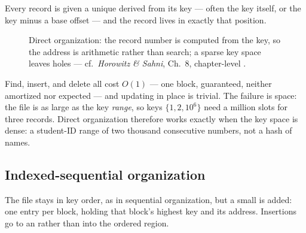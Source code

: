 \documentclass[11pt]{article}
\begin{document}
Every record is given a unique  derived from its key --- often the key itself, or the key minus a base offset --- and the record lives in exactly that position.

\begin{figure}[h]
  \centering
  \caption{Direct organization: the record number is computed from the key, so the address is arithmetic rather than search; a sparse key space leaves holes --- cf.\ \textit{Horowitz \& Sahni}, Ch.~8, chapter-level \cite{HorowitzSahni2008_fundamentals_data_structures}.}
\end{figure}

Find, insert, and delete all cost $O(1)$ --- one block, guaranteed, neither amortized nor expected --- and updating in place is trivial. The failure is space: the file is as large as the key \emph{range}, so keys $\{1, 2, 10^6\}$ need a million slots for three records. Direct organization therefore works exactly when the key space is dense: a student-ID range of two thousand consecutive numbers, not a hash of names.

\subsection{Indexed-sequential organization}

The file stays in key order, as in sequential organization, but a small  is added: one entry per block, holding that block's highest key and its address. Insertions go to an  rather than into the ordered region.
\end{document}

